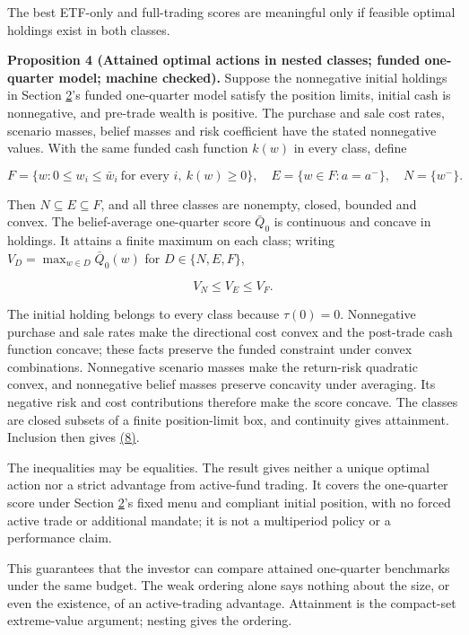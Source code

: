 \documentclass[11pt]{article}
\begin{document}
The best ETF-only and full-trading scores are meaningful only if
feasible optimal holdings exist in both classes.

\label{res:Proposition-4}
\textbf{Proposition 4 (Attained optimal actions in nested classes; funded one-quarter model; machine checked).}
Suppose the nonnegative initial holdings in Section \hyperref[sec:2]{2}'s funded one-quarter
model satisfy the position limits, initial
cash is nonnegative, and pre-trade wealth is positive. The purchase and sale cost
rates, scenario masses, belief masses and risk coefficient have the stated nonnegative
values. With the same funded cash function \(k(w)\) in every class, define

\begin{equation*}
F=\{w:0\leq w_i\leq\bar w_i\ \text{for every }i,\ k(w)\geq0\},
\quad E=\{w\in F:a=a^-\},\quad N=\{w^-\}. \tag{7}\label{eq:7}
\end{equation*}

Then \(N\subseteq E\subseteq F\), and all three classes are nonempty, closed,
bounded and convex. The belief-average one-quarter score \(\bar Q_0\) is continuous
and concave in holdings. It attains a finite maximum on each class; writing
\(V_D=\max_{w\in D}\bar Q_0(w)\) for \(D\in\{N,E,F\}\),

\begin{equation*}
V_N\leq V_E\leq V_F. \tag{8}\label{eq:8}
\end{equation*}

The initial holding belongs to every class because \(\tau(0)=0\). Nonnegative
purchase and sale rates make the directional cost convex and the post-trade cash
function concave; these facts preserve the funded constraint under convex
combinations. Nonnegative scenario masses make the return-risk quadratic convex,
and nonnegative belief masses preserve concavity under averaging. Its negative
risk and cost contributions therefore make the score concave.
The classes are closed subsets of a finite position-limit box, and continuity
gives attainment. Inclusion then gives \hyperref[eq:8]{(8)}.

The inequalities may be equalities. The result gives neither a unique optimal
action nor a strict advantage from active-fund trading. It covers the one-quarter
score under Section \hyperref[sec:2]{2}'s fixed menu and compliant initial position, with no forced active
trade or additional mandate; it is not a multiperiod policy or a performance claim.

This guarantees that the investor can compare attained one-quarter
benchmarks under the same budget. The weak ordering alone says
nothing about the size, or even the existence, of an active-trading
advantage. Attainment is the compact-set extreme-value argument;
nesting gives the ordering.
\end{document}
